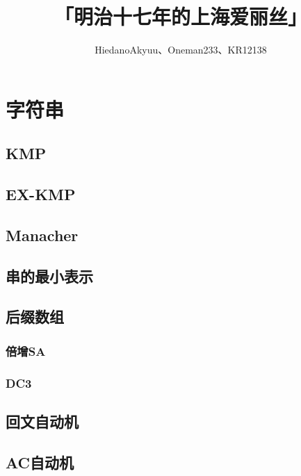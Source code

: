 \documentclass[twocolumn,a4]{article}
\title{\CJKfamily{hei} \bfseries 「明治十七年的上海爱丽丝」}
\author{HiedanoAkyuu、Oneman233、KR12138}
\newcommand{\addcpp}[1]{}
\begin{document}
 \small
\begin{titlepage}
\maketitle
\end{titlepage}

\newpage
\pagestyle{empty}
\renewcommand{\contentsname}{目录}
\tableofcontents
\newpage\clearpage
\newpage
\pagestyle{fancy}
\setcounter{page}{1}   %

\section{字符串}
	\subsection{KMP}
		\addcpp{string/KMP}
	\subsection{EX-KMP}
		\addcpp{string/EX-KMP}
	\subsection{Manacher}
		\addcpp{string/manacher}
	\subsection{串的最小表示}
	\subsection{后缀数组}
		\subsubsection{倍增SA}
			\addcpp{string/sa_da}
		\subsubsection{DC3}
	\subsection{回文自动机}
		\addcpp{string/PAM}
	\subsection{AC自动机	}
\end{document}
